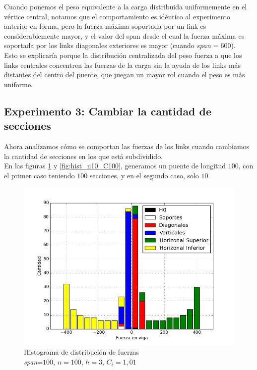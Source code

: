 Cuando ponemos el peso equivalente a la carga distribuida uniformemente en el
vértice central, notamos que el comportamiento es idéntico al experimento
anterior en forma, pero la fuerza máxima soportada por un link es considerablemente mayor, y el valor del span desde el cual la fuerza máxima es soportada por los links diagonales exteriores es mayor (cuando $span = 600$).\\

Esto se explicaría porque la distribución centralizada del peso fuerza a que los links centrales concentren las fuerzas de la carga sin la ayuda de los links más distantes del centro del puente, que juegan un mayor rol cuando el peso es más uniforme.

\newpage
\subsection{Experimento 3: Cambiar la cantidad de secciones}

Ahora analizamos cómo se comportan las fuerzas de los links cuando cambiamos la cantidad de secciones en los que está subdividido.\\

En las figuras \ref{fig:hist_n100_C100} y \ref{fig:hist_n10_C100}, generamos un puente de longitud $100$, con el primer caso teniendo $100$ secciones, y en el segundo caso, solo $10$.

\begin{figure}[h!]
\begin{center}
\includegraphics[scale=0.5]{archivos/graficos/hist_n100_C100.png}
\caption{\label{fig:hist_n100_C100}Histograma de distribución de fuerzas\\
\textit{span}=$100$, $n=100$, $h=3$, $C_i=1,01$}
\end{center}
\end{figure}

